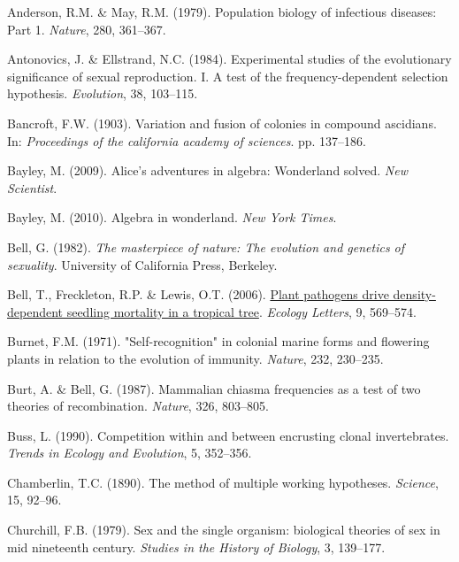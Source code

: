 \documentclass[
  letterpaper,
]{book}
\newlength{\cslhangindent}
\newenvironment{CSLReferences}[2] %
 {\begin{list}{}{%
  \setlength{\itemindent}{0pt}
  \setlength{\leftmargin}{0pt}
  \setlength{\parsep}{0pt}
  \ifodd #1
   \setlength{\leftmargin}{\cslhangindent}
   \setlength{\itemindent}{-1\cslhangindent}
  \fi
  \setlength{\itemsep}{#2\baselineskip}}}
 {\end{list}}
\begin{document}

\label{refs}
\begin{CSLReferences}{1}{0}
Anderson, R.M. \& May, R.M. (1979). Population biology of infectious
diseases: Part 1. \emph{Nature}, 280, 361--367.

Antonovics, J. \& Ellstrand, N.C. (1984). Experimental studies of the
evolutionary significance of sexual reproduction. I. A test of the
frequency-dependent selection hypothesis. \emph{Evolution}, 38,
103--115.

Bancroft, F.W. (1903). Variation and fusion of colonies in compound
ascidians. In: \emph{Proceedings of the california academy of sciences}.
pp. 137--186.

Bayley, M. (2009). Alice's adventures in algebra: Wonderland solved.
\emph{New Scientist}.

Bayley, M. (2010). Algebra in wonderland. \emph{New York Times}.

Bell, G. (1982). \emph{The masterpiece of nature: The evolution and
genetics of sexuality}. University of California Press, Berkeley.

Bell, T., Freckleton, R.P. \& Lewis, O.T. (2006).
\href{https://doi.org/10.1111/j.1461-0248.2006.00905.x}{Plant pathogens
drive density-dependent seedling mortality in a tropical tree}.
\emph{Ecology Letters}, 9, 569--574.

Burnet, F.M. (1971). "Self-recognition" in colonial marine forms and
flowering plants in relation to the evolution of immunity.
\emph{Nature}, 232, 230--235.

Burt, A. \& Bell, G. (1987). Mammalian chiasma frequencies as a test of
two theories of recombination. \emph{Nature}, 326, 803--805.

Buss, L. (1990). Competition within and between encrusting clonal
invertebrates. \emph{Trends in Ecology and Evolution}, 5, 352--356.

Chamberlin, T.C. (1890). The method of multiple working hypotheses.
\emph{Science}, 15, 92--96.

Churchill, F.B. (1979). Sex and the single organism: {b}iological
theories of sex in mid nineteenth century. \emph{Studies in the History
of Biology}, 3, 139--177.


\end{CSLReferences}
\end{document}
